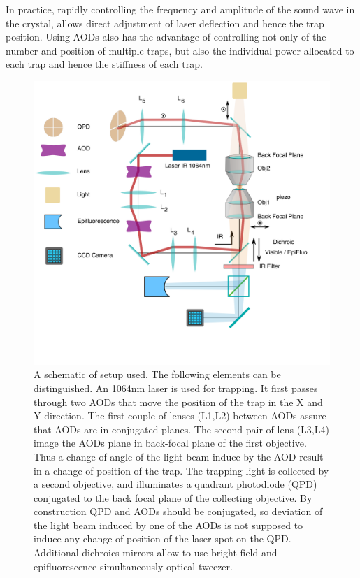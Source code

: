 \documentclass[A4paperpaper,11pt,english]{sphinxmanual}
\begin{document}
In practice, rapidly controlling the frequency and amplitude of the sound wave
in the crystal, allows direct adjustment of laser deflection and hence the
trap position.  Using AODs also has the advantage of controlling not only
of the number and position of multiple traps, but also the individual power
allocated to each trap and hence the stiffness of each trap.
\begin{figure}[htbp]
\centering
\capstart

\includegraphics[width=0.900\linewidth]{setup-plus-1.png}
\caption{A schematic of  setup used. The following elements can be distinguished. An
1064nm laser is used for trapping. It first passes through two AODs that
move the position of the trap in the X  and Y direction.  The first couple
of lenses (L1,L2) between AODs assure that AODs are in conjugated planes.
The second pair of lens (L3,L4) image the AODs plane in back-focal plane
of the first objective.
Thus a change of angle of the light beam induce by the AOD
result in a  change of position of the trap.  The trapping light
is collected by a second objective, and illuminates a quadrant photodiode
(QPD) conjugated to the back focal plane of the collecting objective. By
construction QPD and AODs should be conjugated, so deviation of the light
beam induced by one of the AODs is not supposed to induce any change of
position of the laser spot on the QPD. Additional dichroics mirrors allow to
use bright field and epifluorescence simultaneously optical
tweezer.}\label{index-latex:ots}\end{figure}
\end{document}
